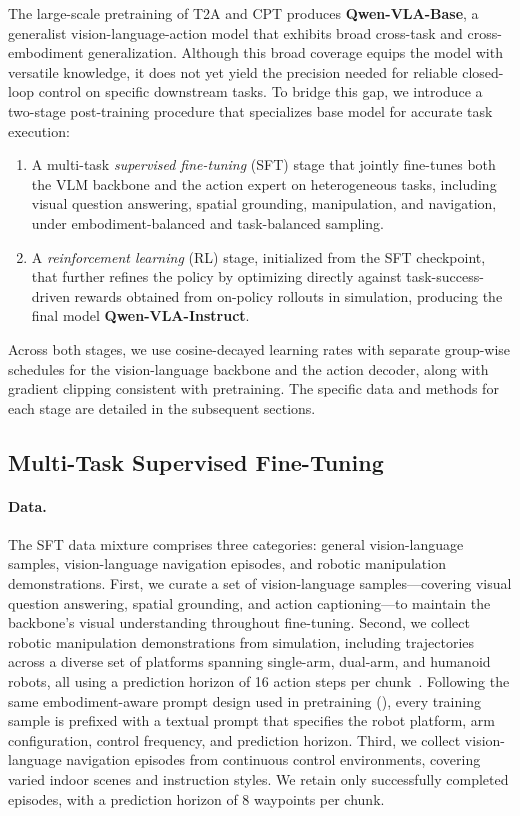 \documentclass{llmxive}
\begin{document}
The large-scale pretraining of T2A and CPT produces \textbf{Qwen-VLA-Base}, a generalist vision-language-action model that exhibits broad cross-task and cross-embodiment generalization.
Although this broad coverage equips the model with versatile knowledge, it does not yet yield the precision needed for reliable closed-loop control on specific downstream tasks.
To bridge this gap, we introduce a two-stage post-training procedure that specializes base model for accurate task execution:
\begin{enumerate}[label=(\roman*),nosep]
    \item A multi-task \emph{supervised fine-tuning} (SFT) stage that jointly fine-tunes both the VLM backbone and the action expert on heterogeneous tasks, including visual question answering, spatial grounding, manipulation, and navigation, under embodiment-balanced and task-balanced sampling.
    \item A \emph{reinforcement learning} (RL) stage, initialized from the SFT checkpoint, that further refines the policy by optimizing directly against task-success-driven rewards obtained from on-policy rollouts in simulation, producing the final model \textbf{Qwen-VLA-Instruct}.
\end{enumerate}
Across both stages, we use cosine-decayed learning rates with separate group-wise schedules for the vision-language backbone and the action decoder, along with gradient clipping consistent with pretraining.
The specific data and methods for each stage are detailed in the subsequent sections.


\subsection{Multi-Task Supervised Fine-Tuning}
\label{sec:sft}


\paragraph{Data.}
The SFT data mixture comprises three categories: general vision-language samples, vision-language navigation episodes, and robotic manipulation demonstrations. 
%
First, we curate a set of vision-language samples---covering visual question answering, spatial grounding, and action captioning---to maintain the backbone’s visual understanding throughout fine-tuning. 
%
Second, we collect robotic manipulation demonstrations from simulation, including trajectories across a diverse set of platforms spanning single-arm, dual-arm, and humanoid robots, all using a prediction horizon of 16 action steps per chunk~\citep{community2026starvla}.
%
Following the same embodiment-aware prompt design used in pretraining (), every training sample is prefixed with a textual prompt that specifies the robot platform, arm configuration, control frequency, and prediction horizon.
%
Third, we collect vision-language navigation episodes from continuous control environments, covering varied indoor scenes and instruction styles. We retain only successfully completed episodes, with a prediction horizon of 8 waypoints per chunk.
\end{document}
